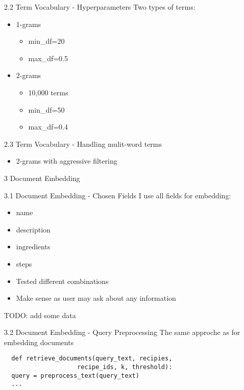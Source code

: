 \documentclass{beamer}
\begin{document}
\begin{frame}{2.2 Term Vocabulary - Hyperparameters}
  Two types of terms:
  \begin{itemize}
    \item 1-grams
      \begin{itemize}
        \item min\_df=20
        \item max\_df=0.5
      \end{itemize}
    \item 2-grams
      \begin{itemize}
        \item 10,000 terms
        \item min\_df=50
        \item max\_df=0.4
      \end{itemize}
  \end{itemize}

\end{frame}

\begin{frame}{2.3 Term Vocabulary - Handling mulit-word terms}
  \begin{itemize}
    \item 2-grams with aggressive filtering
  \end{itemize}
\end{frame}

\begin{frame}{3 Document Embedding}
\end{frame}

\begin{frame}{3.1 Document Embedding - Chosen Fields}
  I use all fields for embedding:
  \begin{itemize}
    \item name
    \item description
    \item ingredients
    \item steps
  \end{itemize}

  \begin{itemize}
    \item Tested different combinations
    \item Make sense as user may ask about any information
  \end{itemize}
  TODO: add some data
\end{frame}

\begin{frame}[fragile]{3.2 Document Embedding - Query Preprocessing}
  The same approche as for embedding documents
    \begin{verbatim}
  def retrieve_documents(query_text, recipies,
                    recipe_ids, k, threshold):
  query = preprocess_text(query_text)
  ...
    \end{verbatim}
\end{frame}
\end{document}
